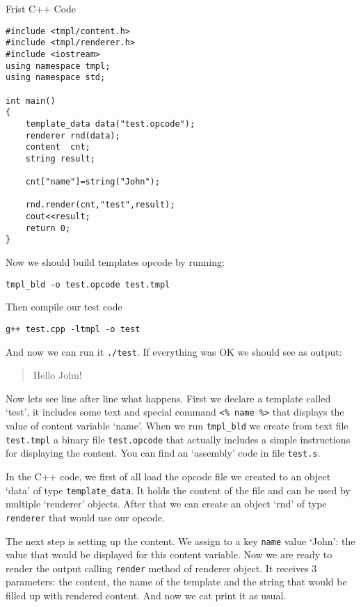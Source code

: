 \documentclass{article}
\newcommand{\tw}[1]{\texttt{#1}}
\begin{document}
\begin{program}
\caption{Frist C++ Code\label{lst:firstcpp}}
\begin{verbatim}
#include <tmpl/content.h>
#include <tmpl/renderer.h>
#include <iostream>
using namespace tmpl;
using namespace std;

int main()
{
    template_data data("test.opcode");
    renderer rnd(data);
    content  cnt;
    string result;

    cnt["name"]=string("John");
    
    rnd.render(cnt,"test",result);
    cout<<result;
    return 0;
}
\end{verbatim}
\end{program}

Now we should build templates opcode by running:

\begin{verbatim}
tmpl_bld -o test.opcode test.tmpl
\end{verbatim}

Then compile our test code

\begin{verbatim}
g++ test.cpp -ltmpl -o test
\end{verbatim}

And now we can run it \tw{./test}. If everything was OK we should see as output:

\begin{quote}
Hello John!
\end{quote}

Now lets see line after line what happens. First we declare a template called `test', it includes some
text and special command \verb+<% name %>+ that displays the value of content variable `name'. When we run
\verb+tmpl_bld+ we create from text file \verb+test.tmpl+ a binary file \verb+test.opcode+ that actually 
includes a simple instructions for displaying the content. You can find an `assembly' code in file \verb+test.s+.

In the C++ code, we first of all load the opcode file we created to an object `data' of
type \verb+template_data+. It holds the content of the file and can be used by multiple 
`renderer' objects. After that we can create an object `rnd' of type \verb+renderer+ that would use our opcode.

The next step is setting up the content. We assign to a key \tw{name} value `John': 
the value that would be displayed for this content variable.
Now we are ready to render the output calling \verb+render+ method of renderer object.
It receives 3 parameters: the content, the name of the template and the string that
would be filled up with rendered content. And now we cat print it as usual.
\end{document}
